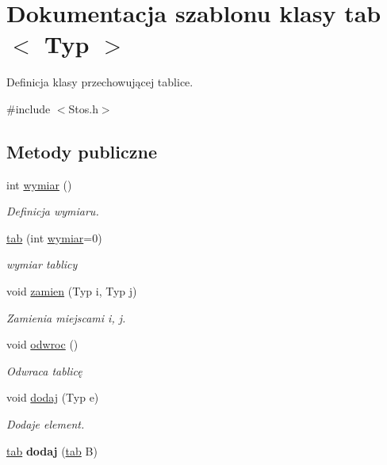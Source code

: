 \hypertarget{classtab}{\section{\-Dokumentacja szablonu klasy tab$<$ \-Typ $>$}
\label{classtab}
}


\-Definicja klasy przechowującej tablice.  




{\ttfamily \#include $<$\-Stos.\-h$>$}

\subsection*{\-Metody publiczne}
\begin{DoxyCompactItemize}
\item 
\hypertarget{classtab_aedffa47955ffaea9876790a5fdbd9562}{int \hyperlink{classtab_aedffa47955ffaea9876790a5fdbd9562}{wymiar} ()}\label{classtab_aedffa47955ffaea9876790a5fdbd9562}

\begin{DoxyCompactList}\small\item\em \-Definicja wymiaru. \end{DoxyCompactList}\item 
\hypertarget{classtab_a36068a968872b0263096a9719a2ad5bb}{\hyperlink{classtab_a36068a968872b0263096a9719a2ad5bb}{tab} (int \hyperlink{classtab_aedffa47955ffaea9876790a5fdbd9562}{wymiar}=0)}\label{classtab_a36068a968872b0263096a9719a2ad5bb}

\begin{DoxyCompactList}\small\item\em wymiar tablicy \end{DoxyCompactList}\item 
void \hyperlink{classtab_a47d35ab4fd1e07333de71f9eb4b7fab2}{zamien} (\-Typ i, \-Typ j)
\begin{DoxyCompactList}\small\item\em \-Zamienia miejscami i, j. \end{DoxyCompactList}\item 
\hypertarget{classtab_a3892398e71e9d23417c8dce1b1ba852f}{void \hyperlink{classtab_a3892398e71e9d23417c8dce1b1ba852f}{odwroc} ()}\label{classtab_a3892398e71e9d23417c8dce1b1ba852f}

\begin{DoxyCompactList}\small\item\em \-Odwraca tablicę \end{DoxyCompactList}\item 
void \hyperlink{classtab_a5abb6bb51a476b922d00f8f3e8615f24}{dodaj} (\-Typ e)
\begin{DoxyCompactList}\small\item\em \-Dodaje element. \end{DoxyCompactList}\item 
\hypertarget{classtab_ab0a19b1dae911cb14ff2dfa4a68cd7a1}{\hyperlink{classtab}{tab} {\bfseries dodaj} (\hyperlink{classtab}{tab} \-B)}\label{classtab_ab0a19b1dae911cb14ff2dfa4a68cd7a1}


\end{DoxyCompactItemize}
